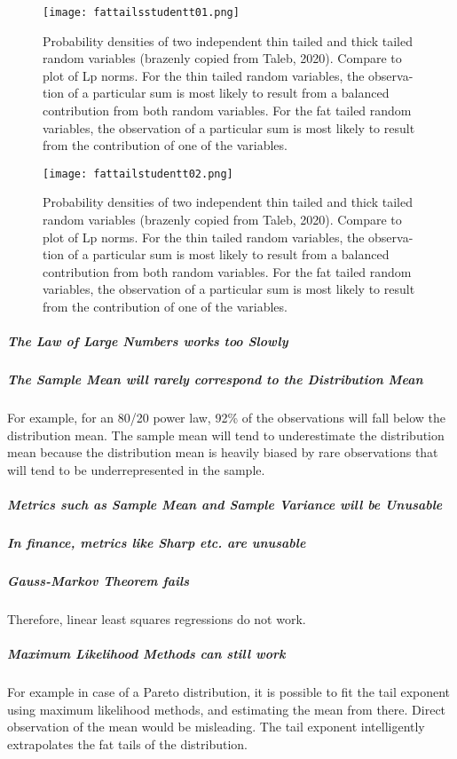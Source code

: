 \begin{figure}
\centering
    \texttt{[image: fattailsstudentt01.png]}
    \caption{Probability densities of two independent thin tailed and thick tailed random variables (brazenly copied from Taleb, 2020). Compare to plot of Lp norms. For the thin tailed random variables, the observa- tion of a particular sum is most likely to result from a balanced contribution from both random variables. For the fat tailed random variables, the observation of a particular sum is most likely to result from the contribution of one of the variables.}
    \label{fig:fattails01}
\end{figure}

\begin{figure}
\centering
    \texttt{[image: fattailstudentt02.png]}
    \caption{Probability densities of two independent thin tailed and thick tailed random variables (brazenly copied from Taleb, 2020). Compare to plot of Lp norms. For the thin tailed random variables, the observa- tion of a particular sum is most likely to result from a balanced contribution from both random variables. For the fat tailed random variables, the observation of a particular sum is most likely to result from the contribution of one of the variables.}
    \label{fig:fattails01}
\end{figure}

\subparagraph{The Law of Large Numbers works too Slowly}

\subparagraph{The Sample Mean will rarely correspond to the Distribution Mean}
For example, for an 80/20 power law, 92\% of the observations will fall below the distribution mean. The sample mean will tend to underestimate the distribution mean because the distribution mean is heavily biased by rare observations that will tend to be underrepresented in the sample.

\subparagraph{Metrics such as Sample Mean and Sample Variance will be Unusable}

\subparagraph{In finance, metrics like Sharp etc. are unusable}

\subparagraph{Gauss-Markov Theorem fails}
Therefore, linear least squares regressions do not work. 

\subparagraph{Maximum Likelihood Methods can still work}
For example in case of a Pareto distribution, it is possible to fit the tail exponent using maximum likelihood methods, and estimating the mean from there. Direct observation of the mean would be misleading. The tail exponent intelligently extrapolates the fat tails of the distribution.

